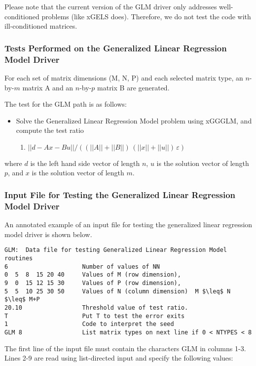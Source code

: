 Please note that the current version of the GLM driver only addresses
well-conditioned problems (like xGELS does).  Therefore, we do not test
the code with ill-conditioned matrices.

\subsubsection{Tests Performed on the Generalized Linear Regression Model Driver}
\dent
For each set of matrix dimensions (M, N, P) and each selected matrix
type, an $n$-by-$m$ matrix A and an $n$-by-$p$ matrix B are generated.

The test for the GLM path is as follows:
\begin{itemize}
\item Solve the Generalized Linear Regression Model problem using xGGGLM,
and compute the test ratio
\begin{enumerate}
\item $|| d - A x - B u || / ( (||A|| + ||B||) \, (||x|| + ||u||) \, \varepsilon)$
\end{enumerate}
\end{itemize}
where $d$ is the left hand side vector of length $n$, $u$ is the
solution vector of length $p$, and $x$ is the solution vector of length
$m$.

\subsubsection{Input File for Testing the Generalized Linear Regression
Model Driver}

\dent
An annotated example of an input file for testing the generalized
linear regression model driver is shown below.
\begin{verbatim}
GLM:  Data file for testing Generalized Linear Regression Model routines
6                     Number of values of NN  
0  5  8  15 20 40     Values of M (row dimension),   
9  0  15 12 15 30     Values of P (row dimension),
5  5  10 25 30 50     Values of N (column dimension)  M $\leq$ N $\leq$ M+P
20.10                 Threshold value of test ratio.
T                     Put T to test the error exits
1                     Code to interpret the seed
GLM 8                 List matrix types on next line if 0 < NTYPES < 8  
\end{verbatim}

The first line of the input file must contain the characters GLM
in columns 1-3.  Lines 2-9 are read using list-directed input and
specify the following values:

